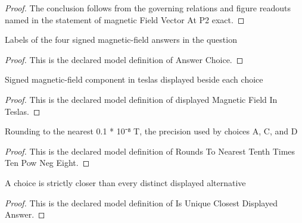 \begin{proof}
  The conclusion follows from the governing relations and figure readouts named in the statement of magnetic Field Vector At P2 exact.
\end{proof}
\begin{definition}
  \label{def:physics:phyx-mini-0916:phyxminiproblems-problemphyxmini0916-answerchoice}
  Labels of the four signed magnetic-field answers in the question
\end{definition}
\begin{proof}
  This is the declared model definition of Answer Choice.
\end{proof}
\begin{definition}
  \label{def:physics:phyx-mini-0916:phyxminiproblems-problemphyxmini0916-displayedmagneticfieldinteslas}
  Signed magnetic-field component in teslas displayed beside each choice
\end{definition}
\begin{proof}
  This is the declared model definition of displayed Magnetic Field In Teslas.
\end{proof}
\begin{definition}
  \label{def:physics:phyx-mini-0916:phyxminiproblems-problemphyxmini0916-roundstonearesttenthtimestenpownegeight}
  Rounding to the nearest 0.1 * 10⁻⁸ T, the precision used by choices A, C, and D
\end{definition}
\begin{proof}
  This is the declared model definition of Rounds To Nearest Tenth Times Ten Pow Neg Eight.
\end{proof}
\begin{definition}
  \label{def:physics:phyx-mini-0916:phyxminiproblems-problemphyxmini0916-isuniqueclosestdisplayedanswer}
  A choice is strictly closer than every distinct displayed alternative
\end{definition}
\begin{proof}
  This is the declared model definition of Is Unique Closest Displayed Answer.
\end{proof}

